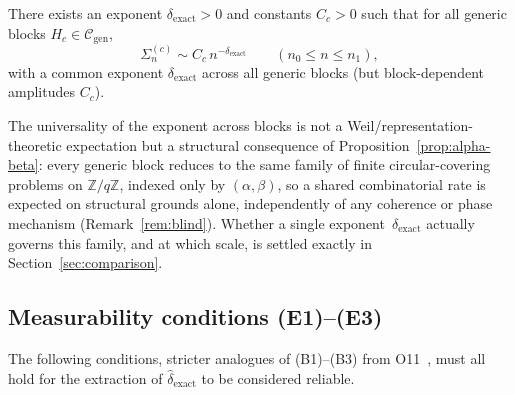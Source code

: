     \begin{hypothesis}
      \label{hyp:decay}
      There exists an exponent $\delta_{\mathrm{exact}}>0$ and constants $C_c>0$ such that
      for all generic blocks $H_c\in\mathcal{C}_{\mathrm{gen}}$,
      \begin{equation}
        \Sigma_n^{(c)} \sim C_c\,n^{-\delta_{\mathrm{exact}}}
        \qquad (n_0\leq n\leq n_1),
        \label{eq:decay-law}
      \end{equation}
      with a common exponent $\delta_{\mathrm{exact}}$ across all generic blocks
      (but block-dependent amplitudes $C_c$).
    \end{hypothesis}

    The universality of the exponent across blocks is not a Weil/representation-theoretic
    expectation but a structural consequence of Proposition~\ref{prop:alpha-beta}: every
    generic block reduces to the same family of finite circular-covering problems on
    $\mathbb{Z}/q\mathbb{Z}$, indexed only by $(\alpha,\beta)$, so a shared combinatorial rate
    is expected on structural grounds alone, independently of any coherence or phase mechanism
    (Remark~\ref{rem:blind}).
    Whether a single exponent~$\delta_{\mathrm{exact}}$ actually governs this family, and at
    which scale, is settled exactly in Section~\ref{sec:comparison}.

  \subsection{Measurability conditions (E1)--(E3)}

    The following conditions, stricter analogues of (B1)--(B3) from O11~\cite{Beau2026a15},
    must all hold for the extraction of $\hat{\delta}_{\mathrm{exact}}$ to be considered reliable.

